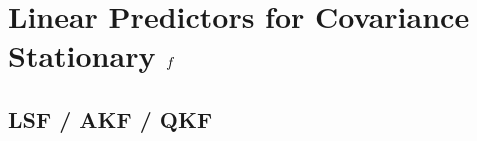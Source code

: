

\section{Linear Predictors for Covariance Stationary $f$ \label{sec:app:predictors}}

\subsection{LSF / AKF / QKF}

